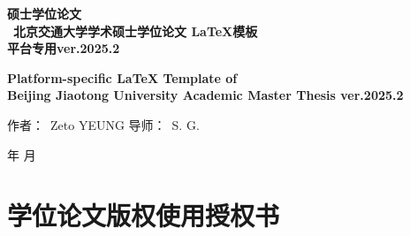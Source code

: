 \renewcommand{\today}{\number\year 年 \number\month 月}
\begin{center}
\vspace*{1.5cm}
\begin{figure}[H] %
  \centering
  
\end{figure}
\vskip 0.1cm
{\song\erhao\ziju{4pt}\textbf{硕士学位论文}}
\vskip 1.2cm
{\,\\\,}
{\song\xiaosan\textbf{ 北京交通大学学术硕士学位论文 \LaTeX{}模板\\ 平台专用ver.2025.2}}
\vskip 1cm

{\song\xiaosan\textbf{ \overleaf{} Platform-specific \LaTeX{} Template of \\Beijing Jiaotong University Academic Master Thesis ver.2025.2}}
\vskip 3.8cm\hspace*{2cm}
\begin{minipage}[t]{5cm}\centering
\hskip -2cm{\sihao\song 作者：\ }{\sihao\song Zeto YEUNG}
\vskip 0.6cm
\hskip -2cm{\sihao\song 导师：\ }{\sihao\song S. G.}
\end{minipage}

\vfill\hspace*{1cm}

\begin{minipage}[t]{5cm}
\begin{center}
{\sihao{}}
\vskip 0.6cm
{\sihao \today}
\end{center}
\end{minipage}

\end{center}



\chapter*{学位论文版权使用授权书}

